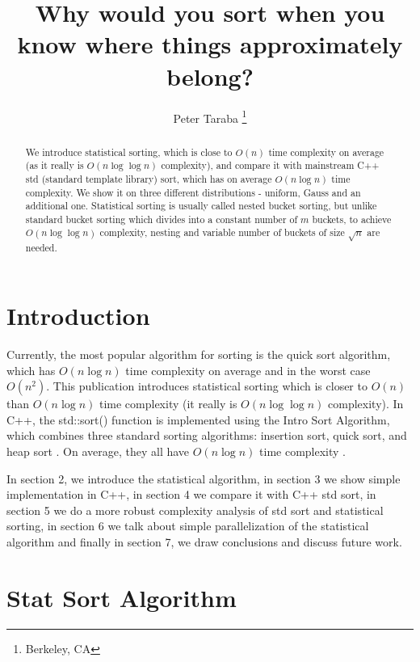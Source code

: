 \documentclass[12pt]{article}
\title{Why would you sort when you know where things approximately belong?}
\author{Peter Taraba \footnote{Berkeley, CA}}
\begin{document}
	
	\maketitle
	
	\begin{abstract}
  		We introduce statistical sorting, which is close to $O(n)$ time complexity on average (as it really is $O(n \log \log n)$ complexity), and compare it with mainstream C++ std (standard template library) sort, which has on average $O(n \log n)$ time complexity. We show it on three different distributions - uniform, Gauss and an additional one. Statistical sorting is usually called nested bucket sorting, but unlike standard bucket sorting which divides into a constant number of $m$ buckets, to achieve $O(n \log \log n)$ complexity, nesting and variable number of buckets of size $\sqrt{n}$ are needed.
	\end{abstract}
	
	\section{Introduction}
	
		Currently, the most popular algorithm for sorting is the quick sort algorithm, which has $O(n \log n)$ time complexity on average \cite{numrec} and in the worst case $O(n^2)$. This publication introduces statistical sorting which is closer to $O(n)$ than $O(n \log n)$ time complexity (it really is $O(n \log \log n)$ complexity). In C++, the std::sort() function is implemented using the Intro Sort Algorithm, which combines three standard sorting algorithms: insertion sort, quick sort, and heap sort \cite{cppsort}. On average, they all have $O(n \log n)$ time complexity \cite{wikisort}.
		
		In section 2, we introduce the statistical algorithm, in section 3 we show simple implementation in C++, in section 4 we compare it with C++ std sort, in section 5 we do a more robust complexity analysis of std sort and statistical sorting, in section 6 we talk about simple parallelization of the statistical algorithm and finally in section 7, we draw conclusions and discuss future work.

	\section{Stat Sort Algorithm}
	
\end{document}
